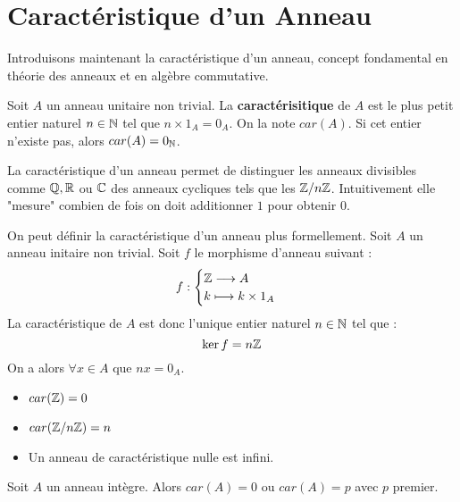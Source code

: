 \section{Caractéristique d'un Anneau}

Introduisons maintenant la caractéristique d'un anneau, concept fondamental en théorie des anneaux et en algèbre 
commutative. 

\begin{definition}
    Soit $A$ un anneau unitaire non trivial. 
    La \textbf{caractérisitique} de $A$ est le plus petit entier naturel $ n \in \mathbb{N}$ tel que $ n \times 1_A = 0_A$. 
    On la note $car(A)$. 
    Si cet entier n'existe pas, alors $car(A) = 0_{\mathbb{N}}$. 
\end{definition}

\begin{remark}
    La caractéristique d'un anneau permet de distinguer les anneaux divisibles comme $\mathbb{Q},\mathbb{R}$ ou $\mathbb{C}$ des anneaux 
    cycliques tels que les $\mathbb{Z} / n \mathbb{Z}$. 
    Intuitivement elle "mesure" combien de fois on doit additionner $1$ pour obtenir $0$. 
\end{remark}

\begin{proposition}
    On peut définir la caractéristique d'un anneau plus formellement. 
    Soit $A$ un anneau initaire non trivial. Soit $f$ le morphisme d'anneau suivant : 
        \[ f : 
            \begin{cases}
                \mathbb{Z} \longrightarrow A \\ 
                k \longmapsto k \times 1_A 
            \end{cases} \]
    La caractéristique de $A$ est donc l'unique entier naturel $n \in \mathbb{N}$ tel que : 
        \[ \ker f = n \mathbb{Z} \] 
    On a alors $ \forall x \in A$ que $ n x = 0_A$. 
\end{proposition}

\begin{theorem}
    \begin{itemize}
        \item $car (\mathbb{Z}) = 0 $ 
        \item $car (\mathbb{Z} / n \mathbb{Z}) = n $
        \item Un anneau de caractéristique nulle est infini. 
    \end{itemize}
\end{theorem}

\begin{theorem}
    Soit $A$ un anneau intègre. Alors $car(A) = 0$ ou $car(A) = p$ avec $p$ premier. 
\end{theorem}


